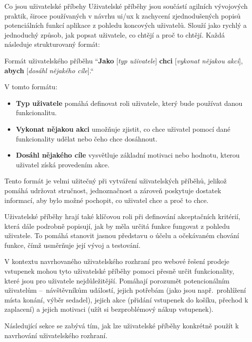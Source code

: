 \begin{subsection}{Co jsou uživatelské příbehy}
    \label{subsec:navrh-ui-uzivatelske-pribehy-co-jsou}
    Uživatelské příběhy jsou součástí agilních vývojových praktik, široce používaných v návrhu \ac{ui}/\ac{ux} k zachycení zjednodušených popisů potenciálních funkcí aplikace z pohledu koncových uživatelů.
    Slouží jako rychlý a jednoduchý způsob, jak popsat uživatele, co chtějí a proč to chtějí\cite{w_articles_user_stories_a_foundation_for_ui_design}.
    Každá  následuje strukturovaný formát:

    \begin{gray-box}{Formát uživatelského příběhu}
        ``\textbf{Jako} [\textit{typ uživatele}] \textbf{chci} [\textit{vykonat nějakou akci}], \textbf{abych} [\textit{dosáhl nějakého cíle}].``
    \end{gray-box}

    V tomto formátu:
    \begin{itemize}
        \item \textbf{Typ uživatele} pomáhá definovat roli uživatele, který bude používat danou funkcionalitu.
        \item \textbf{Vykonat nějakou akci} umožňuje zjistit, co chce uživatel pomocí dané funkcionality udělat nebo čeho chce dosáhnout.
        \item \textbf{Dosáhl nějakého cíle} vysvětluje základní motivaci nebo hodnotu, kterou uživatel získá provedením akce.
    \end{itemize}

    Tento formát je velmi užitečný při vytváření uživatelských příběhů, jelikož pomáhá udržovat stručnost, jednoznačnost a zároveň poskytuje dostatek informací, aby bylo možné pochopit, co uživatel chce a proč to chce.

    Uživatelské příběhy hrají také klíčovou roli při definování akceptačních kritérií, která dále podrobně popisují, jak by měla určitá funkce fungovat z pohledu uživatele.
    To pomáhá stanovit jasnou představu o účelu a očekávaném chování funkce, čímž usměrňuje její vývoj a testování\cite{w_articles_user_stories_a_foundation_for_ui_design}.

    V kontextu navrhovaného uživatelského rozhraní pro webové řešení prodeje vstupenek mohou tyto uživatelské příběhy pomoci přesně určit funkcionality, které jsou pro uživatele nejdůležitější.
    Pomáhají porozumět potencionálním uživatelům –~návštěvníkům událostí, jejich potřebám (jako jsou např.\ prohlížení místa konání, výběr sedadel), jejich akce (přidání vstupenek do košíku, přechod k zaplacení) a jejich motivaci (užít si bezproblémový nákup vstupenek).

    Následující sekce se zabývá tím, jak lze uživatelské příběhy konkrétně použít k navrhování uživatelského rozhraní.
\end{subsection}

